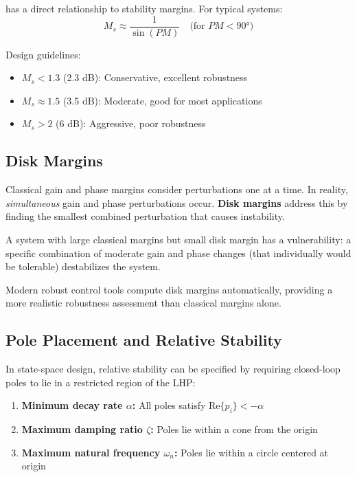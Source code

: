 has a direct relationship to stability margins. For typical systems:
\begin{equation}
M_s \approx \frac{1}{\sin(PM)} \quad \text{(for } PM < 90°\text{)}
\end{equation}

Design guidelines:
\begin{itemize}
    \item $M_s < 1.3$ (2.3 dB): Conservative, excellent robustness
    \item $M_s \approx 1.5$ (3.5 dB): Moderate, good for most applications
    \item $M_s > 2$ (6 dB): Aggressive, poor robustness
\end{itemize}

\subsection{Disk Margins}

Classical gain and phase margins consider perturbations one at a time. In reality, \textit{simultaneous} gain and phase perturbations occur. \textbf{Disk margins} address this by finding the smallest combined perturbation that causes instability.

A system with large classical margins but small disk margin has a vulnerability: a specific combination of moderate gain and phase changes (that individually would be tolerable) destabilizes the system.

Modern robust control tools compute disk margins automatically, providing a more realistic robustness assessment than classical margins alone.

\subsection{Pole Placement and Relative Stability}

In state-space design, relative stability can be specified by requiring closed-loop poles to lie in a restricted region of the LHP:

\begin{enumerate}
    \item \textbf{Minimum decay rate $\alpha$:} All poles satisfy $\text{Re}\{p_i\} < -\alpha$
    \item \textbf{Maximum damping ratio $\zeta$:} Poles lie within a cone from the origin
    \item \textbf{Maximum natural frequency $\omega_n$:} Poles lie within a circle centered at origin
\end{enumerate}

